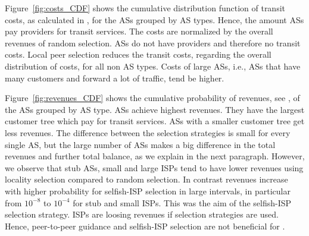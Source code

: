 Figure~\ref{fig:costs_CDF} shows the cumulative distribution function of transit costs, as calculated in , for the ASs grouped by AS types. Hence, the amount ASs pay providers for transit services. The costs are normalized by the overall revenues of random selection. \tier ASs do not have providers and therefore no transit costs. Local peer selection reduces the transit costs, regarding the overall distribution of costs, for all non \tier AS types. Costs of large ASs, i.e., ASs that have many customers and forward a lot of traffic, tend be higher.


Figure~\ref{fig:revenues_CDF} shows the cumulative probability of revenues, see , of the ASs grouped by AS type. \Tier ASs achieve highest revenues. They have the largest customer tree which pay for transit services. ASs with a smaller customer tree get less revenues. The difference between the selection strategies is small for every single AS, but the large number of ASs makes a big difference in the total revenues and further total balance, as we explain in the next paragraph. However, we observe that stub ASs, small and large ISPs tend to have lower revenues using locality selection compared to random selection. In contrast revenues increase with higher probability for selfish-ISP selection in large intervals, in particular from $10^{-8}$ to $10^{-4}$ for stub and small ISPs. This was the aim of the selfish-ISP selection strategy. \Tier ISPs are loosing revenues if selection strategies are used. Hence, peer-to-peer guidance and selfish-ISP selection are not beneficial for \tier.

